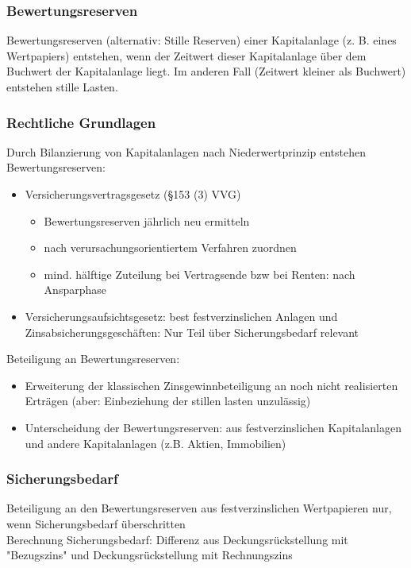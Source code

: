 \documentclass[12pt]{report}
\theoremstyle{dotless}
\theoremstyle{definition}
\begin{document}
\subsubsection{Bewertungsreserven}
Bewertungsreserven (alternativ: Stille Reserven) einer Kapitalanlage (z. B. eines Wertpapiers) entstehen, wenn der Zeitwert dieser Kapitalanlage
über dem Buchwert der Kapitalanlage liegt. Im anderen Fall (Zeitwert kleiner
als Buchwert) entstehen stille Lasten.

\subsubsection{Rechtliche Grundlagen}
Durch Bilanzierung von Kapitalanlagen nach Niederwertprinzip entstehen Bewertungsreserven:
\begin{itemize}
\item Versicherungsvertragsgesetz (§153 (3) VVG)
\begin{itemize}
\item Bewertungsreserven jährlich neu ermitteln
\item nach verursachungsorientiertem Verfahren zuordnen
\item mind. hälftige Zuteilung bei Vertragsende bzw bei Renten: nach Ansparphase
\end{itemize}
\item Versicherungsaufsichtsgesetz: best festverzinslichen Anlagen und Zinsabsicherungsgeschäften: Nur Teil über Sicherungsbedarf relevant
\end{itemize}
Beteiligung an Bewertungsreserven:
\begin{itemize}
\item Erweiterung der klassischen Zinsgewinnbeteiligung an noch nicht realisierten Erträgen (aber: Einbeziehung der stillen lasten unzulässig)
\item Unterscheidung der Bewertungsreserven: aus festverzinslichen Kapitalanlagen und andere Kapitalanlagen (z.B. Aktien, Immobilien)
\end{itemize}

\subsubsection{Sicherungsbedarf}
Beteiligung an den Bewertungsreserven aus festverzinslichen Wertpapieren nur, wenn Sicherungsbedarf überschritten\\
Berechnung Sicherungsbedarf: Differenz aus Deckungsrückstellung mit "Bezugszins" und Deckungsrückstellung mit Rechnungszins
\end{document}

